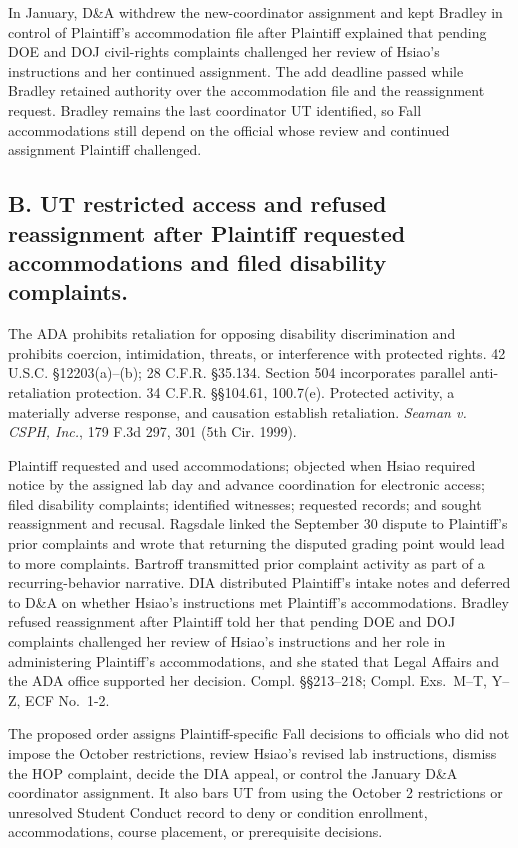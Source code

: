 \documentclass[12pt]{article}
\newcommand{\ComplExs}[1]{Compl. Exs.~#1, ECF No.~1-2}
\begin{document}
In January, D\&A withdrew the new-coordinator assignment and kept Bradley in control of Plaintiff's accommodation file after Plaintiff explained that pending DOE and DOJ civil-rights complaints challenged her review of Hsiao's instructions and her continued assignment. The add deadline passed while Bradley retained authority over the accommodation file and the reassignment request. Bradley remains the last coordinator UT identified, so Fall accommodations still depend on the official whose review and continued assignment Plaintiff challenged.
 
\subsection*{B. UT restricted access and refused reassignment after Plaintiff requested accommodations and filed disability complaints.}
 
The ADA prohibits retaliation for opposing disability discrimination and prohibits coercion, intimidation, threats, or interference with protected rights. 42 U.S.C. \S 12203(a)--(b); 28 C.F.R. \S 35.134. Section 504 incorporates parallel anti-retaliation protection. 34 C.F.R. \S\S 104.61, 100.7(e). Protected activity, a materially adverse response, and causation establish retaliation. \textit{Seaman v. CSPH, Inc.}, 179 F.3d 297, 301 (5th Cir. 1999).
 
Plaintiff requested and used accommodations; objected when Hsiao required notice by the assigned lab day and advance coordination for electronic access; filed disability complaints; identified witnesses; requested records; and sought reassignment and recusal. Ragsdale linked the September 30 dispute to Plaintiff's prior complaints and wrote that returning the disputed grading point would lead to more complaints. Bartroff transmitted prior complaint activity as part of a recurring-behavior narrative. DIA distributed Plaintiff's intake notes and deferred to D\&A on whether Hsiao's instructions met Plaintiff's accommodations. Bradley refused reassignment after Plaintiff told her that pending DOE and DOJ complaints challenged her review of Hsiao's instructions and her role in administering Plaintiff's accommodations, and she stated that Legal Affairs and the ADA office supported her decision. Compl. \S\S 213--218; \ComplExs{M--T, Y--Z}.
 
The proposed order assigns Plaintiff-specific Fall decisions to officials who did not impose the October restrictions, review Hsiao's revised lab instructions, dismiss the HOP complaint, decide the DIA appeal, or control the January D\&A coordinator assignment. It also bars UT from using the October 2 restrictions or unresolved Student Conduct record to deny or condition enrollment, accommodations, course placement, or prerequisite decisions.
 
\end{document}
